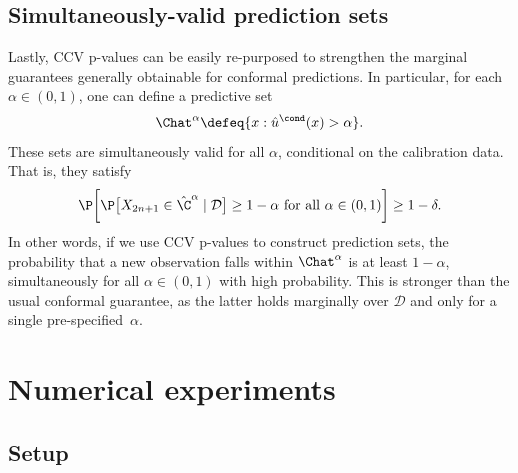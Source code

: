 \subsection{Simultaneously-valid prediction sets} \label{sec:predictive-sets}
Lastly, CCV p-values can be easily re-purposed to strengthen the marginal guarantees generally obtainable for conformal predictions.
In particular, for each $\alpha \in (0,1)$, one can define a predictive set
\begin{equation} \label{eq:simult_pred_sets_def}
    \Chat^\alpha \defeq \{x : \hat{u}^\cond(x) > \alpha\}.
\end{equation}
These sets are simultaneously valid for all $\alpha$, conditional on the calibration data. That is, they satisfy
\begin{equation}
\label{eq:simult_sets_def}
    \P\bigg[ \P\big[X_{2n+1} \in \hat{\C}^\alpha \mid \mathcal{D} \big] \ge 1 - \alpha \text{ for all } \alpha \in (0,1) \bigg] \ge 1 - \delta.
\end{equation}
In other words, if we use CCV p-values to construct prediction sets, the probability that a new observation falls within $\Chat^\alpha$ is at least $1-\alpha$, simultaneously for all $\alpha \in (0,1)$ with high probability. This is stronger than the usual conformal guarantee, as the latter holds marginally over $\mathcal{D}$ and only for a single pre-specified~$\alpha$.


\section{Numerical experiments} \label{sec:exp}

\subsection{Setup} \label{sec:exp-setup}


